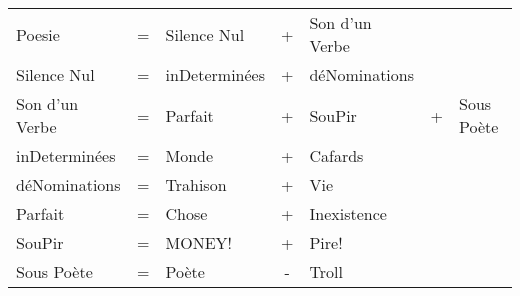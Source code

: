   \begin{center}
    \begin{tabular}{lclclcl}
      Poesie         & = & Silence Nul   & + & Son d’un Verbe &   & \\
      Silence Nul    & = & inDeterminées & + & déNominations  &   & \\
      Son d’un Verbe & = & Parfait       & + & SouPir         & + & Sous Poète \\
      inDeterminées  & = & Monde         & + & Cafards        &   & \\
      déNominations  & = & Trahison      & + & Vie            &   & \\
      Parfait        & = & Chose         & + & Inexistence    &   & \\
      SouPir         & = & MONEY!        & + & Pire!          &   & \\
      Sous Poète     & = & Poète         & - & Troll          &   & \\
    \end{tabular}
  \end{center}

